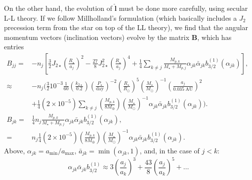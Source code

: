 \documentclass[11pt,
        usenames, %
        dvipsnames %
    ]{article}
\newcommand*{\bm}[1]{\boldsymbol{\mathbf{#1}}}
\newcommand*{\p}[1]{\left(#1\right)}
\newcommand*{\s}[1]{\left[#1\right]}
\newcommand*{\uv}[1]{\hat{\bm{#1}}}
\begin{document}
On the other hand, the evolution of $\uv{l}$ must be done more carefully, using
secular L-L theory. If we follow Millholland's formulation (which basically
includes a $J_2$ precession term from the star on top of the LL theory), we find
that the angular momentum vectors (inclination vectors) evolve by the matrix
$\bm{B}$, which has entries
\begin{align}
    B_{jj} ={}& -n_j\s{
        \frac{3}{2}J_{2\star} \p{\frac{R_\star}{a_j}}^2
        - \frac{27}{8}J_{2\star}^2\p{\frac{R_\star}{a_j}}^4
        + \frac{1}{4}\sum\limits_{k \neq j}
            \frac{M_{p, k}}{M_\star + M_{p, j}}
            \alpha_{jk} \bar{\alpha}_{jk}
            b_{3/2}^{(1)}\p{\alpha_{jk}}},\\
        \approx{}&
            -n_{j}\Bigg(\frac{3}{2}10^{-3}\frac{1}{60}
                \p{\frac{k_{2\star}}{0.2}}
                \p{\frac{P_{\star}}{\mathrm{day}}}^{-2}
                \p{\frac{R_{\star}}{R_{\odot}}}^5
                \p{\frac{M_\star}{M_{\odot}}}^{-1}
                \p{\frac{a_j}{0.035\;\mathrm{AU}}}^2\nonumber\\
            &+ \frac{1}{4} \p{2 \times 10^{-5}}
                \sum\limits_{k \neq j}
                \p{\frac{M_{p, k}}{8 M_{\oplus}}}
                \p{\frac{M_\star}{M_{\odot}}}^{-1}
                \alpha_{jk}\bar{\alpha}_{jk}b_{3/2}^{(1)}\p{\alpha_{jk}}
            \Bigg).
            &\\
    B_{jk} ={}& \frac{1}{4}n_j
            \frac{M_{p, k}}{M_\star + M_{p, j}}
            \alpha_{jk} \bar{\alpha}_{jk}
            b_{3/2}^{(1)}\p{\alpha_{jk}},\\
        ={}& n_j\frac{1}{4} \p{2 \times 10^{-5}}
                \p{\frac{M_{p, k}}{8 M_{\oplus}}}
                \p{\frac{M_\star}{M_{\odot}}}^{-1}
                \alpha_{jk}\bar{\alpha}_{jk}b_{3/2}^{(1)}\p{\alpha_{jk}}.
\end{align}
Above, $\alpha_{jk} = a_{\min} / a_{\max}$, $\bar{a}_{jk} = \min(\alpha_{jk},
1)$, and, in the case of $j < k$:
\begin{equation}
    \alpha_{jk}\bar{\alpha}_{jk}b_{3/2}^{(1)}
        \approx 3\p{\frac{a_j}{a_k}}^3 + \frac{43}{8}\p{\frac{a_j}{a_k}}^5
            + \dots
\end{equation}
\end{document}
